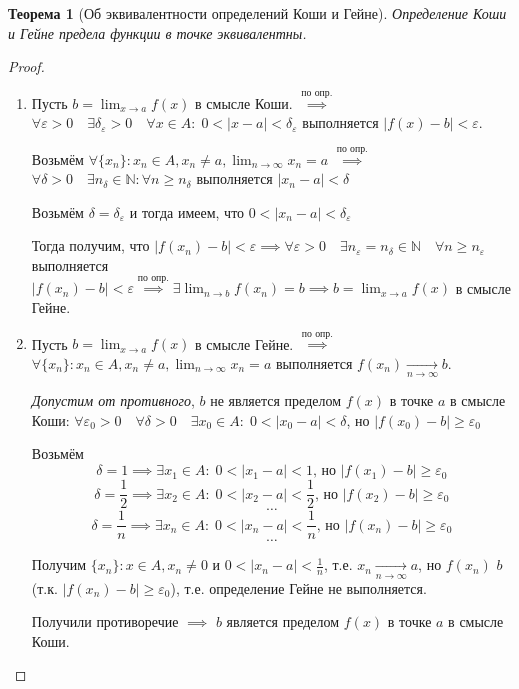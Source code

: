 \documentclass[a4paper,oneside]{article}
\newcommand{\bydef}{\stackrel{\text{по опр.}}{\implies}} %
\newcommand{\dslim}{\displaystyle\lim}
\newcommand{\dslimn}{\dslim_{n \to \infty}}
\newcommand{\N}{\mathbb{N}}
\newcommand{\approach}[1]{\underset{#1}{\longrightarrow}}
\newtheorem{theorem}{Теорема}[subsection]
\theoremstyle{definition}
\theoremstyle{definition}
\theoremstyle{definition}
\begin{document}
\begin{theorem}[Об эквивалентности определений Коши и Гейне]
    Определение Коши и Гейне предела функции в точке эквивалентны.
\end{theorem}
\begin{proof}
    \begin{enumerate}[label=\alph*)]
        \item 
            Пусть $b = \dslim_{x \to a} f(x)$ в смысле Коши.
            $\bydef$ $\forall \varepsilon > 0 \quad 
            \exists \delta_\varepsilon > 0 \quad \forall x \in A: \; 0 < |x - a| < \delta_\varepsilon$
            выполняется $|f(x) - b| < \varepsilon$.

            Возьмём $\forall \{ x_n \}: x_n \in A, x_n \ne a, \dslimn x_n = a$
            $\bydef$ $\forall \delta > 0 \quad \exists n_\delta \in \N: 
            \forall n \ge n_\delta$ выполняется $| x_n - a | < \delta$

            Возьмём $\delta = \delta_\varepsilon$ и тогда имеем, что $0 < |x_n - a| < \delta_\varepsilon$

            Тогда получим, что $|f(x_n) - b| < \varepsilon \implies 
            \forall \varepsilon > 0 \quad \exists n_\varepsilon = n_\delta \in \N \quad
            \forall n \ge n_\varepsilon$ выполняется $|f(x_n) - b| < \varepsilon
            \bydef \exists \dslim_{n \to b} f(x_n) = b \implies b = \dslim_{x \to a} f(x)$
            в смысле Гейне.

        \item
            Пусть $b = \dslim_{x \to a} f(x)$ в смысле Гейне.
            $\bydef$ $\forall \{ x_n \}: x_n \in A, x_n \ne a, \dslimn x_n = a$
            выполняется $f(x_n) \approach{n \to \infty} b$.

            \textit{Допустим от противного}, $b$ не является пределом $f(x)$ в точке $a$ в смысле Коши:
            $\forall \varepsilon_0 > 0 \quad \forall \delta > 0 \quad \exists x_0 \in A: \; 0 < |x_0 - a| < \delta$,
            но $|f(x_0) - b| \ge \varepsilon_0$

            Возьмём
            \[\delta = 1 \implies \exists x_1 \in A: \; 0 < |x_1 - a| < 1 \text{, но } |f(x_1) - b| \ge \varepsilon_0\]
            \[\delta = \frac{1}{2} \implies \exists x_2 \in A: \; 0 < |x_2 - a| < \frac{1}{2} \text{, но } |f(x_2) - b| \ge \varepsilon_0\]
            \[\dots\]
            \[\delta = \frac{1}{n} \implies \exists x_n \in A: \; 0 < |x_n - a| < \frac{1}{n} \text{, но } |f(x_n) - b| \ge \varepsilon_0\]
            \[\dots\]

            Получим $\{ x_n \}: x \in A, x_n \ne 0$ и $0 < |x_n - a| < \frac{1}{n}$, т.е.
            $x_n \approach{n \to \infty} a$, но
            $f(x_n)$ \cancel{$\approach{n \to \infty}$} $b$ (т.к. $|f(x_n) - b| \ge \varepsilon_0$),
            т.е. определение Гейне не выполняется.

            Получили противоречие $\implies$ $b$ является пределом $f(x)$ в точке $a$ в смысле Коши.
    \end{enumerate}
\end{proof}
\end{document}

